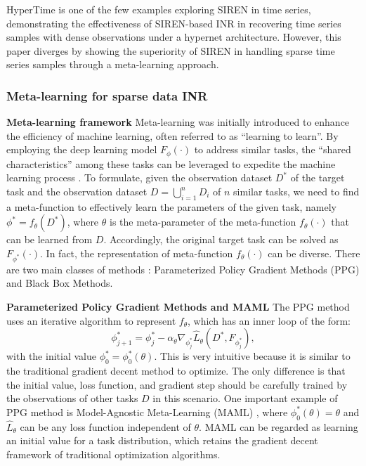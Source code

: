 \documentclass{article}
\begin{document}
HyperTime \cite{fons2022hypertime} is one of the few examples exploring SIREN in time series, demonstrating the effectiveness of SIREN-based INR in recovering time series samples with dense observations under a hypernet architecture.
However, this paper diverges by showing the superiority of SIREN in handling sparse time series samples through a meta-learning approach.


\subsubsection{Meta-learning for sparse data INR}

\textbf{Meta-learning framework}
Meta-learning was initially introduced to enhance the efficiency of machine learning, often referred to as ``learning to learn''.
By employing the deep learning model $F_\phi(\cdot)$ to address similar tasks, the ``shared characteristics'' among these tasks can be leveraged to expedite the machine learning process \cite{raghu2019rapid}.
To formulate, given the observation dataset $D^*$ of the target task and the observation dataset $D=\bigcup_{i=1}^n D_i$ of $n$ similar tasks, we need to find a meta-function to effectively learn the parameters of the given task, namely $\phi^*=f_\theta(D^*)$,
where $\theta$ is the meta-parameter of the meta-function $f_\theta(\cdot)$ that can be learned from $D$. Accordingly, the original target task can be solved as $F_{\phi^*}(\cdot)$.
In fact, the representation of meta-function $f_\theta(\cdot)$ can be diverse. There are two main classes of methods \cite{beck2023survey}:  Parameterized Policy Gradient Methods (PPG) and Black Box Methods.

\textbf{Parameterized Policy Gradient Methods and MAML}
The PPG method uses an iterative algorithm to represent $f_\theta$, which has an inner loop of the form:
$$
\phi^*_{j+1}=\phi_j^*-\alpha_\theta \nabla_{\phi_j^*} \hat{L}_\theta\left(D^*, F_{\phi_j^*}\right),
$$
with the initial value $\phi_0^*=\phi_0^*(\theta)$.
This is very intuitive because it is similar to the traditional gradient decent method to optimize. 
The only difference is that the initial value, loss function, and gradient step should be carefully trained by the observations of other tasks $D$ in this scenario.
One important example of PPG method is  Model-Agnostic Meta-Learning (MAML) \cite{finn2017model}, where $\phi_0^*(\theta)=\theta$ and $\hat{L}_\theta$ can be any loss function independent of $\theta$.
MAML can be regarded as learning an initial value for a task distribution, which retains the gradient decent framework of traditional optimization algorithms.
\end{document}
